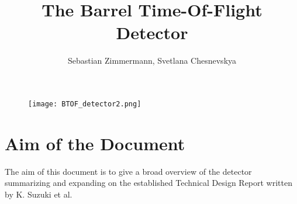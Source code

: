\documentclass[12pt,a4paper,oneside]{article}
\author{Sebastian Zimmermann, Svetlana Chesnevskya}
\title{The Barrel Time-Of-Flight Detector}
\begin{document}
\maketitle

\begin{figure}[h]
	\centering
	\texttt{[image: BTOF\_detector2.png]}
\end{figure}

\section*{Aim of the Document}
The aim of this document is to give a broad overview of the detector summarizing and expanding on the established Technical Design Report written by K. Suzuki et al.

\newpage
\tableofcontents
\newpage





\newpage

\newpage

\newpage

\newpage

\newpage

\newpage


\newpage




\newpage
{}
\end{document}
